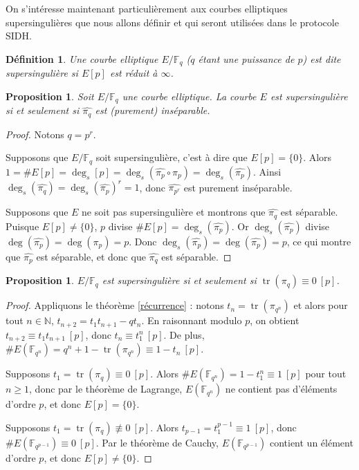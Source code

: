 \documentclass{article}
\theoremstyle{plain}%
\newtheorem{prop}[thm]{Proposition}
\newtheorem{deff}[thm]{Définition}
\theoremstyle{definition}%
\newcommand{\F}{\mathbb{F}}
\newcommand{\N}{\mathbb{N}}
\newcommand{\h}{\widehat}
\DeclareMathOperator{\tr}{tr}
\begin{document}
On s'intéresse maintenant particulièrement aux courbes elliptiques supersingulières que nous allons définir et qui seront utilisées dans le protocole SIDH.

\begin{deff}
  Une courbe elliptique $E/\F_q$ ($q$ étant une puissance de $p$) est dite supersingulière si $E[p]$ est réduit à $\infty$. 
\end{deff}
\begin{prop}
  \label{pihatsep}
  Soit $E/\F_q$ une courbe elliptique. La courbe $E$ est supersingulière si et seulement si $\widehat{\pi_q}$ est (purement) inséparable.
\end{prop}

\begin{proof}
  Notons $q = p^r$. 

  Supposons que $E/\F_q$ soit supersingulière, c'est à dire que $E[p] = \{0\}$. Alors $1 = \#E[p] = \deg_s[p] = \deg_s(\h{\pi_{p}} \circ \pi_{p}) = \deg_s(\h{\pi_{p}})$. Ainsi $\deg_s(\h{\pi_{q}}) =  \deg_s(\h{\pi_{p}})^r= 1$, donc $\h{\pi_{p^r}}$ est purement inséparable.

  Supposons que $E$ ne soit pas supersingulière et montrons que $\h{\pi_{q}}$ est séparable. Puisque $E[p] \neq \{0\}$, $p$ divise $\#E[p] = \deg_s(\h{\pi_p})$. Or $\deg_s(\h{\pi_p})$ divise $\deg(\h{\pi_p}) = \deg({\pi_p}) = p$. Donc $\deg_s(\h{\pi_p}) = \deg(\h{\pi_p}) =p$, ce qui montre que $\h{\pi_p}$ est séparable, et donc que $\h{\pi_q}$ est séparable.
\end{proof}

\begin{prop}
  \label{pimodp}
  $E/\F_q$ est supersingulière si et seulement si $\tr(\pi_q) \equiv 0\ [p]$. 
\end{prop}

\begin{proof}
  Appliquons le théorème \ref{récurrence} : 
  notons $t_n = \tr(\pi_{q^n})$ 
  et alors pour tout $n\in\N$, 
  $t_{n+2} = t_1 t_{n+1} -qt_n$.
  En raisonnant modulo $p$, on obtient $t_{n+2} \equiv t_1 t_{n+1}\ [p]$, donc $t_n \equiv t_1^n\ [p]$. 
  De plus, $\#E(\F_{q^n}) = q^n + 1 - \tr(\pi_{q^n}) \equiv 1 - t_n\ [p]$.

Supposons $t_1 = \tr(\pi_q) \equiv 0\ [p]$. 
Alors $\#E(\F_{q^n}) = 1 - t_1^n \equiv 1\ [p]$ pour tout $n \ge 1$, donc par le théorème de Lagrange, $E(\F_{q^n})$ ne contient pas d’éléments d’ordre $p$, et donc $E[p] = \{0\}$.

Supposons $t_1 = \tr(\pi_q) \not\equiv 0\ [p]$. 
Alors $t_{p-1} = t_1^{p-1} \equiv 1\ [p]$, donc $\#E(\F_{q^{p-1}}) \equiv 0\ [p]$. Par le théorème de Cauchy, $E(\F_{q^{p-1}})$ contient un élément d’ordre $p$, et donc $E[p] \neq  \{0\}$.
\end{proof}
\end{document}
